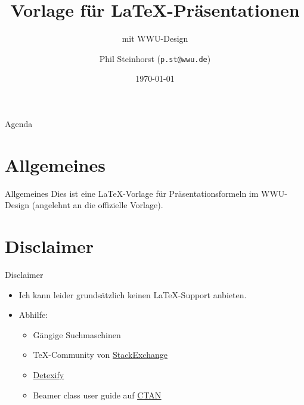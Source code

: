 \documentclass[10pt,
  wide,
  xcolor={x11names},
  hyperref={colorlinks=false},
  pantone312]{beamer}    %
\author{Phil Steinhorst (\texttt{p.st@wwu.de})}
\title{Vorlage für LaTeX-Präsentationen}
\subtitle{mit WWU-Design}
\date{\today}
\begin{document}
\begin{frame}[plain]
  \maketitle    %
\end{frame}

\begin{frame}[t]{Agenda}
\end{frame}

\section{Allgemeines}
\begin{frame}{Allgemeines}
  Dies ist eine \LaTeX-Vorlage für Präsentationsformeln im WWU-Design (angelehnt an die offizielle Vorlage).
\end{frame}

\section{Disclaimer}
\begin{frame}[t]{Disclaimer}
\begin{itemize}[<+->]
  \item Ich kann leider grundsätzlich keinen \LaTeX-Support anbieten.
  \item Abhilfe:
  \begin{itemize}
    \item Gängige Suchmaschinen
    \item \TeX-Community von \href{https://tex.stackexchange.org}{\underline{StackExchange}}
    \item \href{http://detexify.kirelabs.org}{\underline{Detexify}}
    \item Beamer class user guide auf \href{https://ctan.org/tex-archive/macros/latex/contrib/beamer/}{\underline{CTAN}}
  \end{itemize}
\end{itemize}
\end{frame}
\end{document}
